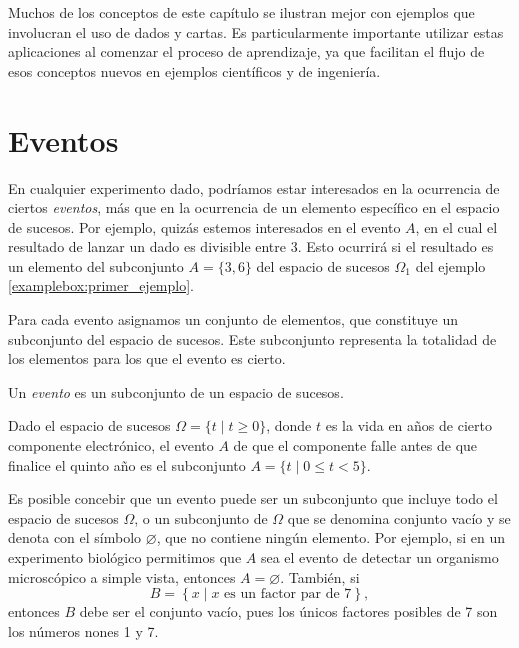 \newpage

Muchos de los conceptos de este capítulo se ilustran mejor con ejemplos que involucran el uso de dados y cartas. Es particularmente importante utilizar estas aplicaciones al comenzar el proceso de aprendizaje, ya que facilitan el flujo de esos conceptos nuevos en ejemplos científicos y de ingeniería.

\section{Eventos}

En cualquier experimento dado, podríamos estar interesados en la ocurrencia de ciertos \emph{eventos}, más que en la ocurrencia de un elemento específico en el espacio de sucesos. Por ejemplo, quizás estemos interesados en el evento $A$, en el cual el resultado de lanzar un dado es divisible entre 3. Esto ocurrirá si el resultado es un elemento del subconjunto $A = \{3, 6\}$ del espacio de sucesos $\Omega_1$ del ejemplo \ref{examplebox:primer_ejemplo}.

Para cada evento asignamos un conjunto de elementos, que constituye un
subconjunto del espacio de sucesos. Este subconjunto representa la totalidad de los elementos para los que el evento es cierto.

\begin{definicion}{}{}
    Un \emph{evento} es un subconjunto de un espacio de sucesos.
\end{definicion}

\begin{examplebox}{}{}
    Dado el espacio de sucesos $\Omega = \{t \mid t \geq 0\}$, donde $t$ es la vida en años de cierto componente electrónico, el evento $A$ de que el componente falle antes de que finalice el quinto año es el subconjunto $A = \{t \mid 0 \leq t < 5\}$.
\end{examplebox}

Es posible concebir que un evento puede ser un subconjunto que incluye todo el espacio de sucesos $\Omega$, o un subconjunto de $\Omega$ que se denomina conjunto vacío y se denota con el símbolo $\varnothing$, que no contiene ningún elemento. Por ejemplo, si en un experimento biológico permitimos que $A$ sea el evento de detectar un organismo microscópico a simple vista, entonces $A = \varnothing$. También, si
$$B = \left\{ x \mid x \text{ es un factor par de } 7 \right\},$$
entonces $B$ debe ser el conjunto vacío, pues los únicos factores posibles de 7 son los números nones 1 y 7.

